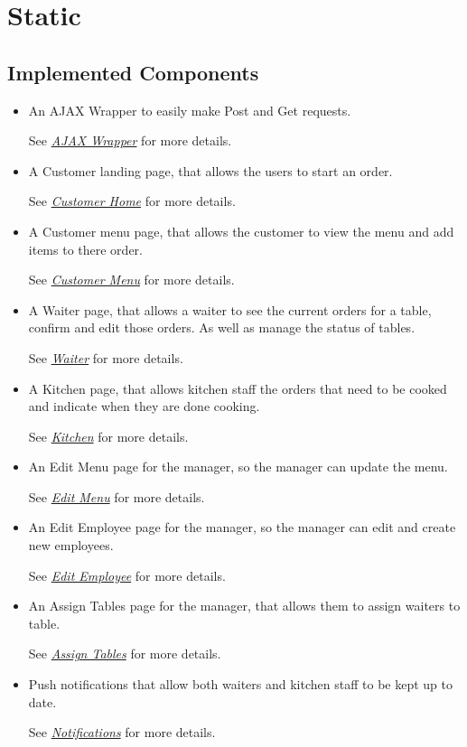 \documentclass[12pt, twoside, a4paper]{report}
\begin{document}
\section*{Static}\label{sec:static}
\subsection*{Implemented Components}
\begin{itemize}
  \item An AJAX Wrapper to easily make Post and Get requests.

    See \textit{\href{run:../JSDoc/module-AJAX_Wrapper.html}{AJAX Wrapper}} for more details.
  \item A Customer landing page, that allows the users to start an order.

    See \textit{\href{run:../JSDoc/module-Customer-Home.html}{Customer Home}} for more details.
  \item A Customer menu page, that allows the customer to view the menu and add items to there order.

  See \textit{\href{run:../JSDoc/module-Customer-Menu.html}{Customer Menu}} for more details.
  \item A Waiter page, that allows a waiter to see the current orders for a table, confirm and edit those orders. As well as manage the status of tables.

    See \textit{\href{run:../JSDoc/module-Waiter.html}{Waiter}} for more details.
  \item A Kitchen page, that allows kitchen staff the orders that need to be cooked and indicate when they are done cooking.

    See \textit{\href{run:../JSDoc/module-Kitchen.html}{Kitchen}} for more details.
  \item An Edit Menu page for the manager, so the manager can update the menu.

    See \textit{\href{run:../JSDoc/module-Manager-Menu.html}{Edit Menu}} for more details.
  \item An Edit Employee page for the manager, so the manager can edit and create new employees.

    See \textit{\href{run:../JSDoc/module-Manager-Employee.html}{Edit Employee}} for more details.
  \item An Assign Tables page for the manager, that allows them to assign waiters to table.

    See \textit{\href{run:../JSDoc/module-Manager-Assign-Tables.html}{Assign Tables}} for more details.
  \item Push notifications that allow both waiters and kitchen staff to be kept up to date.
    
    See \textit{\href{run:../JSDoc/module-Register-Service-Worker.html}{Notifications}} for more details.
\end{itemize}
\end{document}
